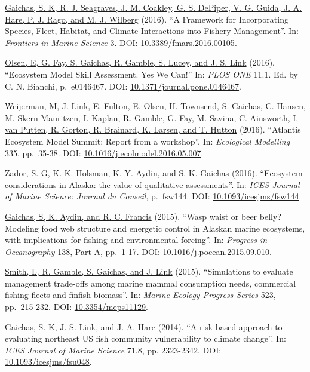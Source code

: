 \documentclass[11pt, a4paper]{awesome-cv}
\begin{document}
\protect\hyperlink{cite-gaichas_framework_2016}{Gaichas, S. K, R. J. Seagraves,
J. M. Coakley, G. S. DePiper, V. G. Guida, J. A. Hare, P. J. Rago, and
M. J. Wilberg} (2016). ``A Framework for
Incorporating Species, Fleet, Habitat, and Climate Interactions into
Fishery Management''. In: \emph{Frontiers in Marine Science} 3. DOI:
\href{https://doi.org/10.3389\%2Ffmars.2016.00105}{10.3389/fmars.2016.00105}.

\protect\hyperlink{cite-olsen_ecosystem_2016}{Olsen, E, G. Fay, S. Gaichas, R.
Gamble, S. Lucey, and J. S. Link} (2016).
``Ecosystem Model Skill Assessment. Yes We Can!'' In: \emph{PLOS ONE} 11.1.
Ed. by C. N. Bianchi, p.~e0146467. DOI:
\href{https://doi.org/10.1371\%2Fjournal.pone.0146467}{10.1371/journal.pone.0146467}.

\protect\hyperlink{cite-weijerman_atlantis_2016}{Weijerman, M, J. Link, E.
Fulton, E. Olsen, H. Townsend, S. Gaichas, C. Hansen, M.
Skern-Mauritzen, I. Kaplan, R. Gamble, G. Fay, M. Savina, C. Ainsworth,
I. van Putten, R. Gorton, R. Brainard, K. Larsen, and T.
Hutton} (2016). ``Atlantis Ecosystem
Model Summit: Report from a workshop''. In: \emph{Ecological Modelling} 335,
pp.~35-38. DOI:
\href{https://doi.org/10.1016\%2Fj.ecolmodel.2016.05.007}{10.1016/j.ecolmodel.2016.05.007}.

\protect\hyperlink{cite-zador_ecosystem_2016}{Zador, S. G, K. K. Holsman, K. Y.
Aydin, and S. K. Gaichas} (2016).
``Ecosystem considerations in Alaska: the value of qualitative
assessments''. In: \emph{ICES Journal of Marine Science: Journal du Conseil},
p.~fsw144. DOI:
\href{https://doi.org/10.1093\%2Ficesjms\%2Ffsw144}{10.1093/icesjms/fsw144}.

\protect\hyperlink{cite-gaichas_wasp_2015}{Gaichas, S, K. Aydin, and R. C.
Francis} (2015). ``Wasp waist or beer belly?
Modeling food web structure and energetic control in Alaskan marine
ecosystems, with implications for fishing and environmental forcing''.
In: \emph{Progress in Oceanography} 138, Part A, pp.~1-17. DOI:
\href{https://doi.org/10.1016\%2Fj.pocean.2015.09.010}{10.1016/j.pocean.2015.09.010}.

\protect\hyperlink{cite-smith_simulations_2015}{Smith, L, R. Gamble, S.
Gaichas, and J. Link} (2015).
``Simulations to evaluate management trade-offs among marine mammal
consumption needs, commercial fishing fleets and finfish biomass''. In:
\emph{Marine Ecology Progress Series} 523, pp.~215-232. DOI:
\href{https://doi.org/10.3354\%2Fmeps11129}{10.3354/meps11129}.

\protect\hyperlink{cite-gaichas_risk-based_2014}{Gaichas, S. K, J. S. Link, and
J. A. Hare} (2014). ``A risk-based
approach to evaluating northeast US fish community vulnerability to
climate change''. In: \emph{ICES Journal of Marine Science} 71.8, pp.
2323-2342. DOI:
\href{https://doi.org/10.1093\%2Ficesjms\%2Ffsu048}{10.1093/icesjms/fsu048}.
\end{document}
